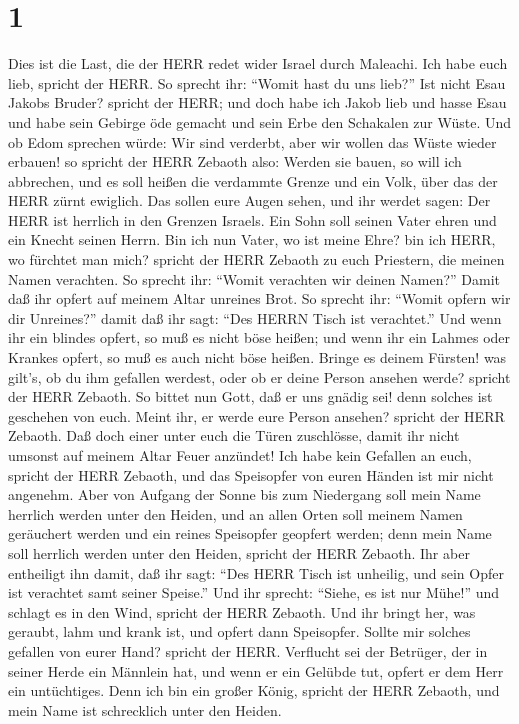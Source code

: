 \hypertarget{section}{%
\section{1}\label{section}}

 Dies ist die Last, die der HERR redet wider Israel durch
Maleachi.  Ich habe euch lieb, spricht der HERR. So sprecht
ihr: ``Womit hast du uns lieb?'' Ist nicht Esau Jakobs Bruder? spricht
der HERR; und doch habe ich Jakob lieb  und hasse Esau und
habe sein Gebirge öde gemacht und sein Erbe den Schakalen zur Wüste.
 Und ob Edom sprechen würde: Wir sind verderbt, aber wir
wollen das Wüste wieder erbauen! so spricht der HERR Zebaoth also:
Werden sie bauen, so will ich abbrechen, und es soll heißen die
verdammte Grenze und ein Volk, über das der HERR zürnt ewiglich.
 Das sollen eure Augen sehen, und ihr werdet sagen: Der HERR
ist herrlich in den Grenzen Israels.  Ein Sohn soll seinen
Vater ehren und ein Knecht seinen Herrn. Bin ich nun Vater, wo ist meine
Ehre? bin ich HERR, wo fürchtet man mich? spricht der HERR Zebaoth zu
euch Priestern, die meinen Namen verachten. So sprecht ihr: ``Womit
verachten wir deinen Namen?''  Damit daß ihr opfert auf
meinem Altar unreines Brot. So sprecht ihr: ``Womit opfern wir dir
Unreines?'' damit daß ihr sagt: ``Des HERRN Tisch ist verachtet.''
 Und wenn ihr ein blindes opfert, so muß es nicht böse
heißen; und wenn ihr ein Lahmes oder Krankes opfert, so muß es auch
nicht böse heißen. Bringe es deinem Fürsten! was gilt's, ob du ihm
gefallen werdest, oder ob er deine Person ansehen werde? spricht der
HERR Zebaoth.  So bittet nun Gott, daß er uns gnädig sei!
denn solches ist geschehen von euch. Meint ihr, er werde eure Person
ansehen? spricht der HERR Zebaoth.  Daß doch einer unter
euch die Türen zuschlösse, damit ihr nicht umsonst auf meinem Altar
Feuer anzündet! Ich habe kein Gefallen an euch, spricht der HERR
Zebaoth, und das Speisopfer von euren Händen ist mir nicht angenehm.
 Aber von Aufgang der Sonne bis zum Niedergang soll mein
Name herrlich werden unter den Heiden, und an allen Orten soll meinem
Namen geräuchert werden und ein reines Speisopfer geopfert werden; denn
mein Name soll herrlich werden unter den Heiden, spricht der HERR
Zebaoth.  Ihr aber entheiligt ihn damit, daß ihr sagt:
``Des HERR Tisch ist unheilig, und sein Opfer ist verachtet samt seiner
Speise.''  Und ihr sprecht: ``Siehe, es ist nur Mühe!'' und
schlagt es in den Wind, spricht der HERR Zebaoth. Und ihr bringt her,
was geraubt, lahm und krank ist, und opfert dann Speisopfer. Sollte mir
solches gefallen von eurer Hand? spricht der HERR. 
Verflucht sei der Betrüger, der in seiner Herde ein Männlein hat, und
wenn er ein Gelübde tut, opfert er dem Herr ein untüchtiges. Denn ich
bin ein großer König, spricht der HERR Zebaoth, und mein Name ist
schrecklich unter den Heiden.

